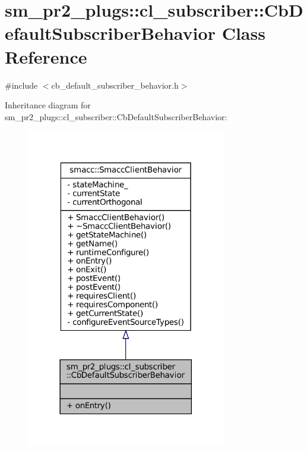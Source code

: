 \hypertarget{classsm__pr2__plugs_1_1cl__subscriber_1_1CbDefaultSubscriberBehavior}{}\section{sm\+\_\+pr2\+\_\+plugs\+:\+:cl\+\_\+subscriber\+:\+:Cb\+Default\+Subscriber\+Behavior Class Reference}
\label{classsm__pr2__plugs_1_1cl__subscriber_1_1CbDefaultSubscriberBehavior}


{\ttfamily \#include $<$cb\+\_\+default\+\_\+subscriber\+\_\+behavior.\+h$>$}



Inheritance diagram for sm\+\_\+pr2\+\_\+plugs\+:\+:cl\+\_\+subscriber\+:\+:Cb\+Default\+Subscriber\+Behavior\+:
\nopagebreak
\begin{figure}[H]
\begin{center}
\leavevmode
\includegraphics[width=246pt]{classsm__pr2__plugs_1_1cl__subscriber_1_1CbDefaultSubscriberBehavior__inherit__graph}
\end{center}
\end{figure}


